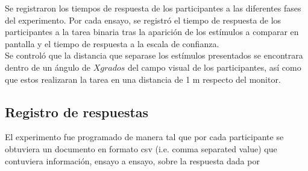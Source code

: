 Se registraron los tiempos de respuesta de los participantes a las diferentes fases del experimento. Por cada ensayo, se registró el tiempo de respuesta de los participantes a la tarea binaria tras la aparición de los estímulos a comparar en pantalla y el tiempo de respuesta a la escala de confianza.\\

Se controló que la distancia que separase los estímulos presentados se encontrara dentro de un ángulo de $X grados$ del campo visual de los participantes, así como que estos realizaran la tarea en una distancia de 1 m respecto del monitor.



\subsection{Registro de respuestas}

El experimento fue programado de manera tal que por cada participante se obtuviera un documento en formato csv (i.e. comma separated value) que contuviera información, ensayo a ensayo, sobre la respuesta dada por 
